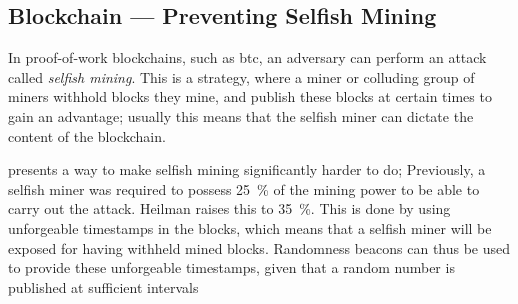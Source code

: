 \subsection{Blockchain --- Preventing Selfish Mining}\label{sub:blockchain_preventing_selfish_mining}
In proof-of-work blockchains, such as \gls{btc}, an adversary can perform an attack called \emph{selfish mining}.
This is a strategy, where a miner or colluding group of miners withhold blocks they mine, and publish these blocks at certain times to gain an advantage;
usually this means that the selfish miner can dictate the content of the blockchain.

\citet{heilman2014one} presents a way to make selfish mining significantly harder to do;
Previously, a selfish miner was required to possess 25~\% of the mining power to be able to carry out the attack. Heilman raises this to 35~\%.
This is done by using unforgeable timestamps in the blocks, which means that a selfish miner will be exposed for having withheld mined blocks.
Randomness beacons can thus be used to provide these unforgeable timestamps, given that a random number is published at sufficient intervals

